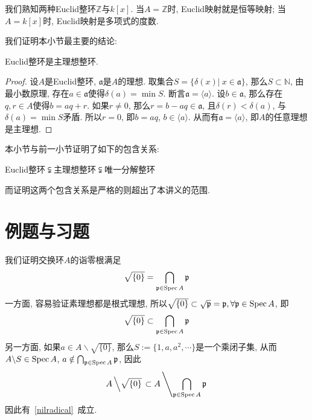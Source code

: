 我们熟知两种Euclid整环$\mathbb{Z}$与$k[x]$.
当$A=\mathbb{Z}$时, Euclid映射就是恒等映射; 当$A=k[x]$时, Euclid映射是多项式的度数.

我们证明本小节最主要的结论:
\begin{prop}
    Euclid整环是主理想整环.
\end{prop}
\begin{proof}
    设$A$是Euclid整环, $\mathfrak{a}$是$A$的理想.
    取集合$S=\{\delta(x)|\ x\in\mathfrak{a}\}$, 那么$S\subset\mathbb{N}$, 由最小数原理, 存在$a\in\mathfrak{a}$使得$\delta(a)=\min{S}$.
    断言$\mathfrak{a}=\langle a\rangle$.
    设$b\in\mathfrak{a}$, 那么存在$q,r\in A$使得$b=aq+r$.
    如果$r\neq 0$, 那么$r=b-aq\in\mathfrak{a}$, 且$\delta(r)<\delta(a)$, 与$\delta(a)=\min{S}$矛盾.
    所以$r=0$, 即$b=aq$, $b\in\langle a\rangle$.
    从而有$\mathfrak{a}=\langle a\rangle$, 即$A$的任意理想是主理想.
\end{proof}

本小节与前一小节证明了如下的包含关系:
\begin{center}
    Euclid整环$\subsetneqq$主理想整环$\subsetneqq$唯一分解整环
\end{center}
而证明这两个包含关系是严格的则超出了本讲义的范围.

\section*{例题与习题}

\begin{eg}
    我们证明交换环$A$的诣零根满足
    \begin{equation}
        \sqrt{\{0\}}=\bigcap_{\mathfrak{p}\in\operatorname{Spec}{A}}\mathfrak{p}\label{nilradical}
    \end{equation}
    一方面, 容易验证素理想都是根式理想, 所以$\sqrt{\{0\}}\subset\sqrt{\mathfrak{p}}=\mathfrak{p},\forall\mathfrak{p}\in\operatorname{Spec}{A}$, 即
    \[\sqrt{\{0\}}\subset\bigcap_{\mathfrak{p}\in\operatorname{Spec}{A}}\mathfrak{p}\]
    另一方面, 如果$a\in A\backslash\sqrt{\{0\}}$, 那么$S:=\{1,a,a^2,\cdots\}$是一个乘闭子集, 从而$A\backslash S\in\operatorname{Spec}{A}$, $a\notin\bigcap_{\mathfrak{p}\in\operatorname{Spec}{A}}\mathfrak{p}$, 因此
    \[A\left\backslash\sqrt{\{0\}}\right.\subset A\left\backslash\bigcap_{\mathfrak{p}\in\operatorname{Spec}{A}}\mathfrak{p}\right.\]
    因此有~\eqref{nilradical}~成立.
\end{eg}

